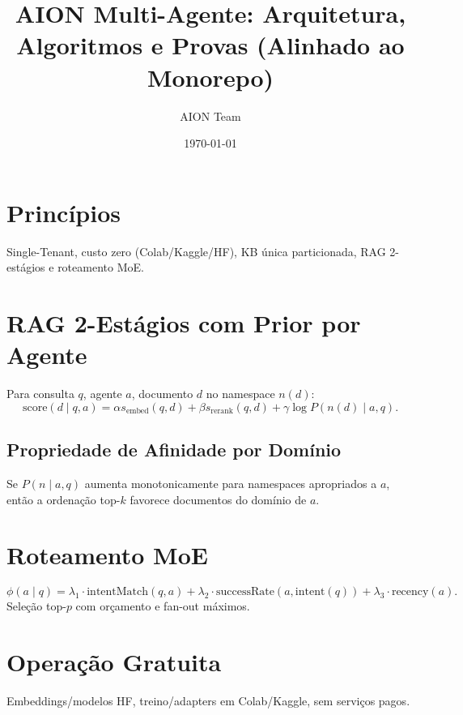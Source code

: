 \documentclass[11pt]{article}
\title{AION Multi-Agente: Arquitetura, Algoritmos e Provas (Alinhado ao Monorepo)}
\author{AION Team}
\date{\today}
\begin{document}
\maketitle

\section{Princípios}
Single-Tenant, custo zero (Colab/Kaggle/HF), KB única particionada, RAG 2-estágios e roteamento MoE.

\section{RAG 2-Estágios com Prior por Agente}
Para consulta $q$, agente $a$, documento $d$ no namespace $n(d)$:
\begin{equation}
\text{score}(d\mid q,a)=\alpha s_{\text{embed}}(q,d)+\beta s_{\text{rerank}}(q,d)+\gamma \log P(n(d)\mid a,q).
\end{equation}
\subsection*{Propriedade de Afinidade por Domínio}
Se $P(n\mid a,q)$ aumenta monotonicamente para namespaces apropriados a $a$, então a ordenação top-$k$ favorece documentos do domínio de $a$.

\section{Roteamento MoE}
\begin{equation}
\phi(a\mid q)=\lambda_1 \cdot \text{intentMatch}(q,a) + \lambda_2 \cdot \text{successRate}(a,\text{intent}(q)) + \lambda_3 \cdot \text{recency}(a).
\end{equation}
Seleção top-$p$ com orçamento e fan-out máximos.

\section{Operação Gratuita}
Embeddings/modelos HF, treino/adapters em Colab/Kaggle, sem serviços pagos.
\end{document}
